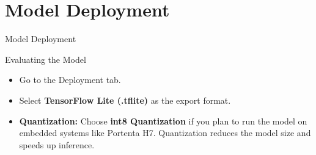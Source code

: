 \documentclass[10pt, a4paper]{beamer}
\begin{document}
	\section{Model Deployment}
\begin{frame}{Model Deployment}
	\begin{block}{Evaluating the Model}
		\begin{itemize}
		 \item Go to the Deployment tab.
		 \item Select \textbf{TensorFlow Lite (.tflite)} as the export format.
		 \item \textbf{Quantization:} Choose \textbf{int8 Quantization} if you plan to run the model on embedded systems like Portenta H7. Quantization reduces the model size and speeds up inference.
			
		\end{itemize}
\end{block}
\end{frame}


	
\end{document}
